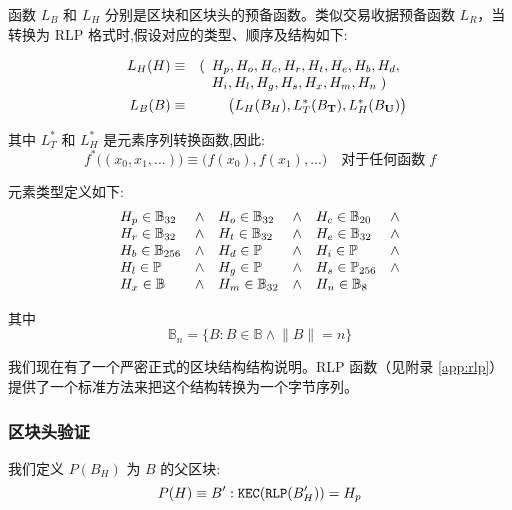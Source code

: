 \documentclass[9pt,oneside]{amsart}
\begin{document}
\begin{multicols}{2}
函数 $L_B$ 和 $L_H$ 分别是区块和区块头的预备函数。类似交易收据预备函数 $L_R$，当转换为 RLP 格式时,假设对应的类型、顺序及结构如下:

\begin{eqnarray}
\quad L_H(H) & \equiv & (\begin{array}[t]{l}H_p, H_o, H_c, H_r, H_t, H_e, H_b, H_d,\\ H_i, H_l, H_g, H_s, H_x, H_m, H_n \; )\end{array} \\
\quad L_B(B) & \equiv & \big( L_H(B_H), L_T^*(B_\mathbf{T}), L_H^*(B_\mathbf{U}) \big)
\end{eqnarray}

其中 $L_T^*$ 和 $L_H^*$ 是元素序列转换函数,因此:
\begin{equation}
f^*\big( (x_0, x_1, ...) \big) \equiv \big( f(x_0), f(x_1), ... \big) \quad \text{对于任何函数} \; f
\end{equation}

元素类型定义如下:
\begin{equation}
\begin{array}[t]{lclclcl}
H_p \in \mathbb{B}_{32} & \wedge & H_o \in \mathbb{B}_{32} & \wedge & H_c \in \mathbb{B}_{20} & \wedge \\
H_r \in \mathbb{B}_{32} & \wedge & H_t \in \mathbb{B}_{32} & \wedge & H_e \in \mathbb{B}_{32} & \wedge \\
H_b \in \mathbb{B}_{256} & \wedge & H_d \in \mathbb{P} & \wedge & H_i \in \mathbb{P} & \wedge \\
H_l \in \mathbb{P} & \wedge & H_g \in \mathbb{P} & \wedge & H_s \in \mathbb{P}_{256} & \wedge \\
H_x \in \mathbb{B} & \wedge & H_m \in \mathbb{B}_{32} & \wedge & H_n \in \mathbb{B}_{8}
\end{array}
\end{equation}

其中
\begin{equation}
\mathbb{B}_n = \{ B: B \in \mathbb{B} \wedge \lVert B \rVert = n \}
\end{equation}

我们现在有了一个严密正式的区块结构结构说明。RLP 函数（见附录 \ref{app:rlp}）提供了一个标准方法来把这个结构转换为一个字节序列。

\subsubsection{区块头验证}

我们定义 $P(B_H)$ 为 $B$ 的父区块:
\begin{equation}
P(H) \equiv B': \mathtt{\tiny KEC}(\mathtt{\tiny RLP}(B'_H)) = H_p
\end{equation}


\end{multicols}
\end{document}
